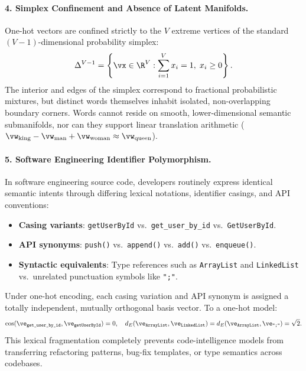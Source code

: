 \documentclass[../../main.tex]{subfiles}
\begin{document}
\paragraph{4. Simplex Confinement and Absence of Latent Manifolds.}
One-hot vectors are confined strictly to the $V$ extreme vertices of the standard $(V-1)$-dimensional probability simplex:
\begin{equation}
\label{eq:standard_simplex}
\Delta^{V-1} = \left\{ \vx \in \R^V : \sum_{i=1}^V x_i = 1, \; x_i \ge 0 \right\}.
\end{equation}
The interior and edges of the simplex correspond to fractional probabilistic mixtures, but distinct words themselves inhabit isolated, non-overlapping boundary corners. Words cannot reside on smooth, lower-dimensional semantic submanifolds, nor can they support linear translation arithmetic ($\vw_{\text{king}} - \vw_{\text{man}} + \vw_{\text{woman}} \approx \vw_{\text{queen}}$).

\paragraph{5. Software Engineering Identifier Polymorphism.}
In software engineering source code, developers routinely express identical semantic intents through differing lexical notations, identifier casings, and API conventions:
\begin{itemize}
    \item \textbf{Casing variants}: \texttt{getUserById} vs.~\texttt{get\_user\_by\_id} vs.~\texttt{GetUserById}.
    \item \textbf{API synonyms}: \texttt{push()} vs.~\texttt{append()} vs.~\texttt{add()} vs.~\texttt{enqueue()}.
    \item \textbf{Syntactic equivalents}: Type references such as \texttt{ArrayList} and \texttt{LinkedList} vs.~unrelated punctuation symbols like \texttt{";"}.
\end{itemize}
Under one-hot encoding, each casing variation and API synonym is assigned a totally independent, mutually orthogonal basis vector. To a one-hot model:
\begin{equation}
\label{eq:code_syntax_equidistance}
\cos(\ve_{\text{\texttt{get\_user\_by\_id}}}, \ve_{\text{\texttt{getUserById}}}) = 0, \quad d_E(\ve_{\text{\texttt{ArrayList}}}, \ve_{\text{\texttt{LinkedList}}}) = d_E(\ve_{\text{\texttt{ArrayList}}}, \ve_{\text{\texttt{";"}}}) = \sqrt{2}.
\end{equation}
This lexical fragmentation completely prevents code-intelligence models from transferring refactoring patterns, bug-fix templates, or type semantics across codebases.
\end{document}
